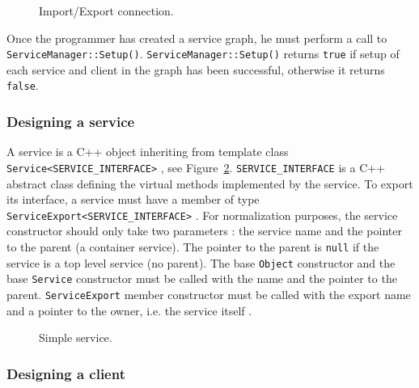 \begin{figure}[h]
  \begin{center}
    
    \caption{\label{fig:tms320c3x_service_connection} Import/Export connection.}
  \end{center}
\end{figure}

Once \hfill the \hfill programmer \hfill has \hfill created \hfill a \hfill service \hfill graph, \hfill he \hfill must \hfill perform \hfill a \hfill call \hfill to \hfill \texttt{ServiceManager::Setup()}.
\texttt{ServiceManager::Setup()} returns \texttt{true} if setup of each service and client in the graph has been successful, otherwise it returns \texttt{false}.

\subsubsection{Designing a service}

A service is a C++ object inheriting from template class \texttt{Service<SERVICE\_INTERFACE>} , see Figure~\ref{fig:tms320c3x_simple_service}.
\texttt{SERVICE\_INTERFACE} is a C++ abstract class defining the virtual methods implemented by the service.
To export its interface, a service must have a member of type \texttt{ServiceExport<SERVICE\_INTERFACE>} .
For normalization purposes, the service constructor should only take two parameters : the service name and the pointer to the parent (a container service).
The pointer to the parent is \texttt{null} if the service is a top level service (no parent).
The base \texttt{Object} constructor  and the base \texttt{Service} constructor  must be called with the name and the pointer to the parent.
\texttt{ServiceExport} member constructor must be called with the export name and a pointer to the owner, i.e. the service itself .

\begin{figure}[h]
  \begin{center}
    
    \caption{\label{fig:tms320c3x_simple_service} Simple service.}
  \end{center}
\end{figure}

\subsubsection{Designing a client}

